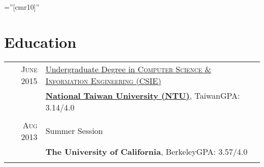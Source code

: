 \documentclass[a4paper,10pt]{article} %
\begin{document}
\pagestyle{empty} %

\font\fb=''[cmr10]'' %

\vspace*{-2.5cm}
\par{\par} %







\section{Education}

\begin{tabular}{rl}	
\textsc{June} 2015& \href{https://www.csie.ntu.edu.tw}{Undergraduate Degree in \textsc{}\textsc{Computer Science \& Information Engineering (CSIE)}} \\
&\normalsize\textbf{\href{https://www.csie.ntu.edu.tw}{National Taiwan University (NTU)}}, Taiwan\hfill \normalsize \textsc{GPA}: 3.14/4.0 \\
&\\

\textsc{Aug} 2013& Summer Session\\
&\normalsize\textbf{The University of California}, Berkeley\hfill \normalsize \textsc{GPA}: 3.57/4.0 \\
&\\

\end{tabular}
\end{document}
